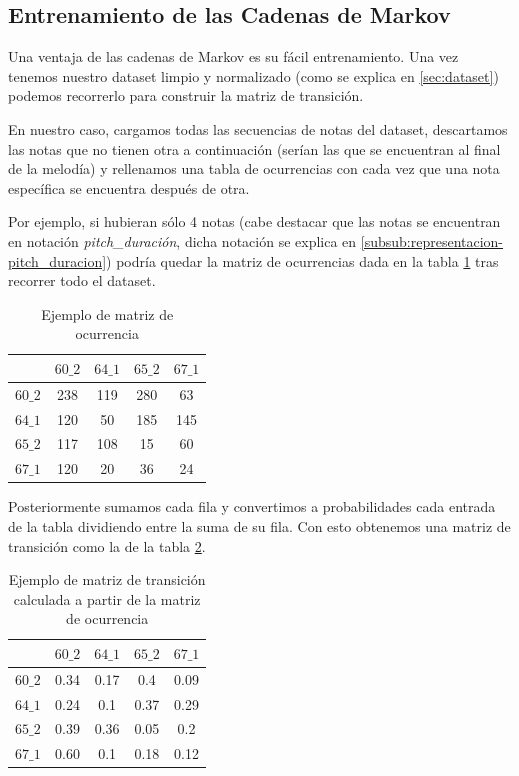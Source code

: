     \subsection{Entrenamiento de las Cadenas de Markov}
    \label{subsec:entrenamientoCadenasMarkov}
    Una ventaja de las cadenas de Markov es su fácil entrenamiento. Una vez tenemos nuestro dataset limpio y normalizado (como se explica en \ref{sec:dataset}) podemos recorrerlo para construir la matriz de transición.

    En nuestro caso, cargamos todas las secuencias de notas del dataset, descartamos las notas que no tienen otra a continuación (serían las que se encuentran al final de la melodía) y rellenamos una tabla de ocurrencias con cada vez que una nota específica se encuentra después de otra.

    Por ejemplo, si hubieran sólo 4 notas (cabe destacar que las notas se encuentran en notación \textit{pitch\_duración}, dicha notación se explica en \ref{subsub:representacion-pitch_duracion}) podría quedar la matriz de ocurrencias dada en la tabla \ref{tab:sampleOcurrenceMatrix} tras recorrer todo el dataset.

    \begin{table}
	\centering
	\begin{tabular}{c|c|c|c|c}
		\textbf{} & \textbf{$60\_2$} & \textbf{$64\_1$} &         
            \textbf{$65\_2$} &     \textbf{$67\_1$}\\
		\hline
		\textbf{$60\_2$} & 238 & 119 & 280 & 63\\
		\hline
		\textbf{$64\_1$} & 120 & 50 & 185 & 145\\
		\hline
		\textbf{$65\_2$} & 117 & 108 & 15 & 60\\
		\hline
		\textbf{$67\_1$} & 120 & 20 & 36 & 24\\
	\end{tabular}
	\caption{Ejemplo de matriz de ocurrencia}
	\label{tab:sampleOcurrenceMatrix}
    \end{table}

    Posteriormente sumamos cada fila y convertimos a probabilidades cada entrada de la tabla dividiendo entre la suma de su fila. Con esto obtenemos una matriz de transición como la de la tabla \ref{tab:sampleTransitionMatrix}.

    \begin{table}
	\centering
	\begin{tabular}{c|c|c|c|c}
		\textbf{} & \textbf{$60\_2$} & \textbf{$64\_1$} &         
            \textbf{$65\_2$} &     \textbf{$67\_1$}\\
		\hline
		\textbf{$60\_2$} & 0.34 & 0.17 & 0.4 & 0.09\\
		\hline
		\textbf{$64\_1$} & 0.24 & 0.1 & 0.37 & 0.29\\
		\hline
		\textbf{$65\_2$} & 0.39 & 0.36 & 0.05 & 0.2\\
		\hline
		\textbf{$67\_1$} & 0.60 & 0.1 & 0.18 & 0.12\\
	\end{tabular}
	\caption{Ejemplo de matriz de transición calculada a partir de la matriz de ocurrencia}
	\label{tab:sampleTransitionMatrix}
    \end{table}


